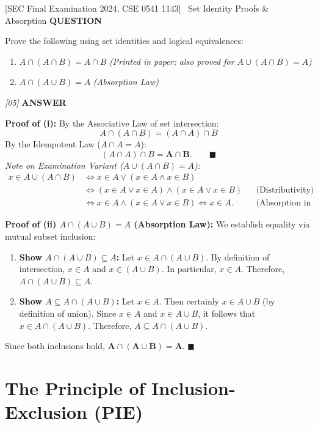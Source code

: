 \documentclass[11pt,a4paper]{article}
\newcommand{\Qlabel}{\textbf{\color{navy}\footnotesize\MakeUppercase{Question}}\par\smallskip}
\newcommand{\Alabel}{\textbf{\color{teal}\footnotesize\MakeUppercase{Answer}}\par\smallskip}
\begin{document}
\begin{exambox}{[SEC Final Examination 2024, CSE 0541 1143] \ Set Identity Proofs \& Absorption}
\Qlabel
Prove the following using set identities and logical equivalences:
\begin{enumerate}[label=(\roman*)]
    \item $A \cap (A \cap B) = A \cap B$ \quad \textit{(Printed in paper; also proved for $A \cup (A \cap B) = A$)}
    \item $A \cap (A \cup B) = A$ \quad \textit{(Absorption Law)}
\end{enumerate}
\hfill\textit{[05]}
\tcblower
\Alabel
\textbf{Proof of (i):}
By the Associative Law of set intersection:
\[
A \cap (A \cap B) = (A \cap A) \cap B
\]
By the Idempotent Law ($A \cap A = A$):
\[
(A \cap A) \cap B = \mathbf{A \cap B}. \qquad \blacksquare
\]
\textit{Note on Examination Variant ($A \cup (A \cap B) = A$):}
\begin{align*}
x \in A \cup (A \cap B) &\iff x \in A \lor (x \in A \land x \in B) \\
&\iff (x \in A \lor x \in A) \land (x \in A \lor x \in B) && \text{(Distributivity)} \\
&\iff x \in A \land (x \in A \lor x \in B) \iff x \in A. && \text{(Absorption in Logic)}
\end{align*}

\medskip
\textbf{Proof of (ii) $A \cap (A \cup B) = A$ (Absorption Law):}
We establish equality via mutual subset inclusion:
\begin{enumerate}
    \item \textbf{Show $A \cap (A \cup B) \subseteq A$:}
    Let $x \in A \cap (A \cup B)$. By definition of intersection, $x \in A$ and $x \in (A \cup B)$. In particular, $x \in A$. Therefore, $A \cap (A \cup B) \subseteq A$.
    \item \textbf{Show $A \subseteq A \cap (A \cup B)$:}
    Let $x \in A$. Then certainly $x \in A \cup B$ (by definition of union). Since $x \in A$ and $x \in A \cup B$, it follows that $x \in A \cap (A \cup B)$. Therefore, $A \subseteq A \cap (A \cup B)$.
\end{enumerate}
Since both inclusions hold, $\mathbf{A \cap (A \cup B) = A}$. $\blacksquare$
\end{exambox}

\section{The Principle of Inclusion-Exclusion (PIE)}
\end{document}
